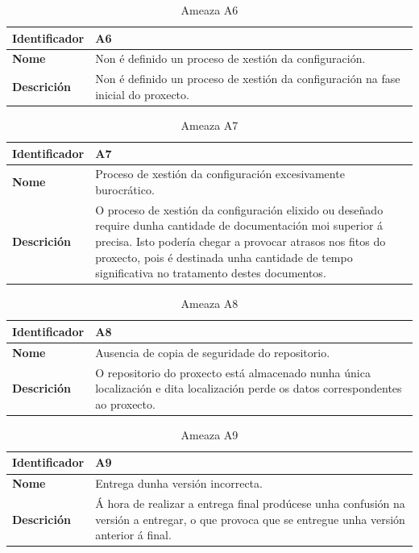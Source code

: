 \begin{table}[H]
\caption{Ameaza A6}
\label{A6}
\begin{tabularx}{\textwidth}{|l|X|}
\hline
\textbf{Identificador} & A6 \\ \hline
\textbf{Nome} & Non é definido un proceso de xestión da configuración. \\ \hline
\textbf{Descrición} & Non é definido un proceso de xestión da configuración na fase inicial do proxecto. \\ \hline
\end{tabularx}
\end{table}

\begin{table}[H]
\caption{Ameaza A7}
\label{A7}
\begin{tabularx}{\textwidth}{|l|X|}
\hline
\textbf{Identificador} & A7 \\ \hline
\textbf{Nome} & Proceso de xestión da configuración excesivamente burocrático. \\ \hline
\textbf{Descrición} & O proceso de xestión da configuración elixido ou deseñado require dunha cantidade de documentación moi superior á precisa. Isto podería chegar a provocar atrasos nos fitos do proxecto, pois é destinada unha cantidade de tempo significativa no tratamento destes documentos. \\ \hline
\end{tabularx}
\end{table}

\begin{table}[H]
\caption{Ameaza A8}
\label{A8}
\begin{tabularx}{\textwidth}{|l|X|}
\hline
\textbf{Identificador} & A8 \\ \hline
\textbf{Nome} & Ausencia de copia de seguridade do repositorio. \\ \hline
\textbf{Descrición} & O repositorio do proxecto está almacenado nunha única localización e dita localización perde os datos correspondentes ao proxecto. \\ \hline
\end{tabularx}
\end{table}

\begin{table}[H]
\caption{Ameaza A9}
\label{A9}
\begin{tabularx}{\textwidth}{|l|X|}
\hline
\textbf{Identificador} & A9 \\ \hline
\textbf{Nome} & Entrega dunha versión incorrecta. \\ \hline
\textbf{Descrición} & Á hora de realizar a entrega final prodúcese unha confusión na versión a entregar, o que provoca que se entregue unha versión anterior á final. \\ \hline
\end{tabularx}
\end{table}

